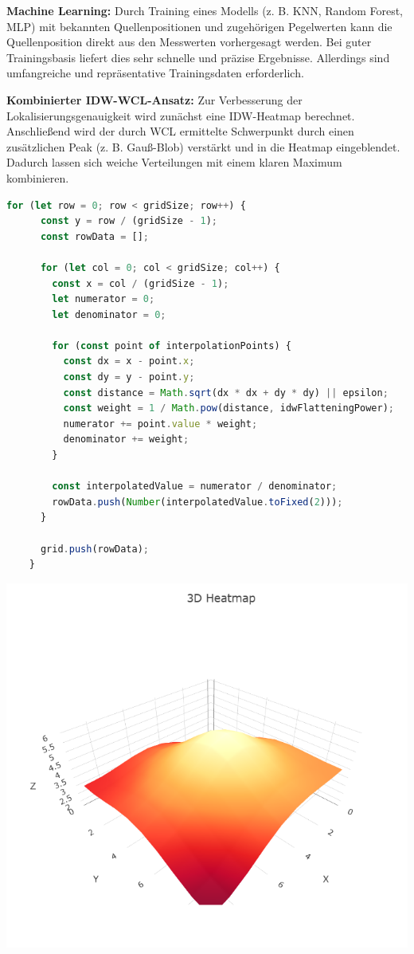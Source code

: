 \textbf{Machine Learning:}  
Durch Training eines Modells (z. B. KNN, Random Forest, MLP) mit bekannten Quellenpositionen und zugehörigen Pegelwerten kann die Quellenposition direkt aus den Messwerten vorhergesagt werden. Bei guter Trainingsbasis liefert dies sehr schnelle und präzise Ergebnisse. Allerdings sind umfangreiche und repräsentative Trainingsdaten erforderlich.

\textbf{Kombinierter IDW-WCL-Ansatz:}  
Zur Verbesserung der Lokalisierungsgenauigkeit wird zunächst eine IDW-Heatmap berechnet. Anschließend wird der durch WCL ermittelte Schwerpunkt durch einen zusätzlichen Peak (z. B. Gauß-Blob) verstärkt und in die Heatmap eingeblendet. Dadurch lassen sich weiche Verteilungen mit einem klaren Maximum kombinieren.
\begin{lstlisting}[language=JavaScript, caption={Kombinierter IDW-WCL-Ansatz}]
    for (let row = 0; row < gridSize; row++) {
      const y = row / (gridSize - 1);
      const rowData = [];

      for (let col = 0; col < gridSize; col++) {
        const x = col / (gridSize - 1);
        let numerator = 0;
        let denominator = 0;

        for (const point of interpolationPoints) {
          const dx = x - point.x;
          const dy = y - point.y;
          const distance = Math.sqrt(dx * dx + dy * dy) || epsilon;
          const weight = 1 / Math.pow(distance, idwFlatteningPower);
          numerator += point.value * weight;
          denominator += weight;
        }

        const interpolatedValue = numerator / denominator;
        rowData.push(Number(interpolatedValue.toFixed(2)));
      }

      grid.push(rowData);
    }
\end{lstlisting}
\begin{minipage}[b]{0.5\textwidth}
  \includegraphics[width=\textwidth]{../images/Heatmap/IDWWCLHeatmap.png}
\end{minipage}

